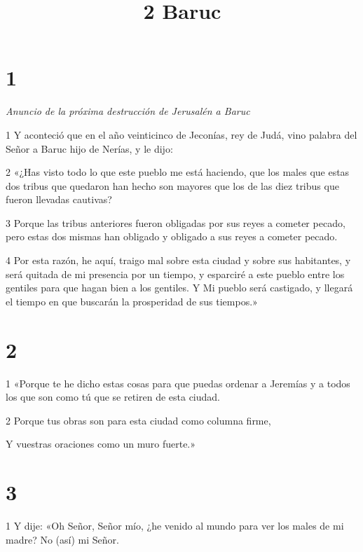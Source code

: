 

\title{2 Baruc}

\chapter{1}

\par \textit{Anuncio de la próxima destrucción de Jerusalén a Baruc}

\par 1 Y aconteció que en el año veinticinco de Jeconías, rey de Judá, vino palabra del Señor a Baruc hijo de Nerías, y le dijo:

\par 2 «¿Has visto todo lo que este pueblo me está haciendo, que los males que estas dos tribus que quedaron han hecho son mayores que los de las diez tribus que fueron llevadas cautivas?

\par 3 Porque las tribus anteriores fueron obligadas por sus reyes a cometer pecado, pero estas dos mismas han obligado y obligado a sus reyes a cometer pecado.

\par 4 Por esta razón, he aquí, traigo mal sobre esta ciudad y sobre sus habitantes, y será quitada de mi presencia por un tiempo, y esparciré a este pueblo entre los gentiles para que hagan bien a los gentiles. Y Mi pueblo será castigado, y llegará el tiempo en que buscarán la prosperidad de sus tiempos.»

\chapter{2}

\par 1 «Porque te he dicho estas cosas para que puedas ordenar a Jeremías y a todos los que son como tú que se retiren de esta ciudad.

\par 2 Porque tus obras son para esta ciudad como columna firme,

\par Y vuestras oraciones como un muro fuerte.»

\chapter{3}

\par 1 Y dije: «Oh Señor, Señor mío, ¿he venido al mundo para ver los males de mi madre? No (así) mi Señor.

